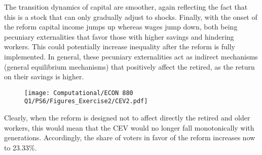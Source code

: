 \documentclass[12pt]{article}
\begin{document}
\begin{figure}[hbt!]
    \centering
    \vspace{1cm}
\end{figure}

The transition dynamics of capital are smoother, again reflecting the fact that this is a stock that can only gradually adjust to shocks. Finally, with the onset of the reform capital income jumps up whereas wages jump down, both being pecuniary externalities that favor those with higher savings and hindering workers. This could potentially increase inequality after the reform is fully implemented. In general, these pecuniary externalities act as indirect mechanisms (general equilibrium mechanisms) that positively affect the retired, as the return on their savings is higher.

\begin{figure}[hbt!]
    \centering
\texttt{[image: Computational/ECON 880 Q1/PS6/Figures\_Exercise2/CEV2.pdf]}
\end{figure}

Clearly, when the reform is designed not to affect directly the retired and older workers, this would mean that the CEV would no longer fall monotonically with generations. Accordingly, the share of voters in favor of the reform increases now to 23.33\%.
\end{document}
